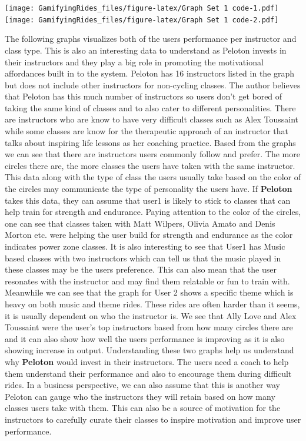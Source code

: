 \documentclass[
]{article}
\begin{document}
\texttt{[image: GamifyingRides\_files/figure-latex/Graph Set 1 code-1.pdf]} \texttt{[image: GamifyingRides\_files/figure-latex/Graph Set 1 code-2.pdf]}

The following graphs visualizes both of the users performance per instructor and class type. This is also an interesting data to understand as Peloton invests in their instructors and they play a big role in promoting the motivational affordances built in to the system. Peloton has 16 instructors listed in the graph but does not include other instructors for non-cycling classes. The author believes that Peloton has this much number of instructors so users don't get bored of taking the same kind of classes and to also cater to different personalities. There are instructors who are know to have very difficult classes such as Alex Toussaint while some classes are know for the therapeutic approach of an instructor that talks about inspiring life lessons as her coaching practice. Based from the graphs we can see that there are instructors users commonly follow and prefer. The more circles there are, the more classes the users have taken with the same instructor. This data along with the type of class the users usually take based on the color of the circles may communicate the type of personality the users have. If \textbf{Peloton} takes this data, they can assume that user1 is likely to stick to classes that can help train for strength and endurance. Paying attention to the color of the circles, one can see that classes taken with Matt Wilpers, Olivia Amato and Denis Morton etc. were helping the user build for strength and endurance as the color indicates power zone classes. It is also interesting to see that User1 has Music based classes with two instructors which can tell us that the music played in these classes may be the users preference. This can also mean that the user resonates with the instructor and may find them relatable or fun to train with. Meanwhile we can see that the graph for User 2 shows a specific theme which is heavy on both music and theme rides. These rides are often harder than it seems, it is usually dependent on who the instructor is. We see that Ally Love and Alex Toussaint were the user's top instructors based from how many circles there are and it can also show how well the users performance is improving as it is also showing increase in output. Understanding these two graphs help us understand why \textbf{Peloton} would invest in their instructors. The users need a coach to help them understand their performance and also to encourage them during difficult rides. In a business perspective, we can also assume that this is another way Peloton can gauge who the instructors they will retain based on how many classes users take with them. This can also be a source of motivation for the instructors to carefully curate their classes to inspire motivation and improve user performance.
\end{document}
